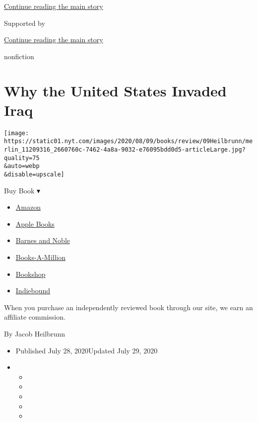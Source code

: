\protect\hyperlink{after-top}{Continue reading the main story}

Supported by

\protect\hyperlink{after-sponsor}{Continue reading the main story}

nonfiction

\hypertarget{why-the-united-states-invaded-iraq}{%
\section{Why the United States Invaded
Iraq}\label{why-the-united-states-invaded-iraq}}

\texttt{[image: https://static01.nyt.com/images/2020/08/09/books/review/09Heilbrunn/merlin\_11209316\_2660760c-7462-4a8a-9032-e76095bdd0d5-articleLarge.jpg?quality=75\\\&auto=webp\\\&disable=upscale]}

Buy Book ▾

\begin{itemize}
\tightlist
\item
  \href{https://www.amazon.com/gp/search?index=books\&tag=NYTBSREV-20\&field-keywords=To+Start+a+War+Robert+Draper}{Amazon}
\item
  \href{https://du-gae-books-dot-nyt-du-prd.appspot.com/buy?title=To+Start+a+War\&author=Robert+Draper}{Apple
  Books}
\item
  \href{https://www.anrdoezrs.net/click-7990613-11819508?url=https\%3A\%2F\%2Fwww.barnesandnoble.com\%2Fw\%2F\%3Fean\%3D9780525561040}{Barnes
  and Noble}
\item
  \href{https://www.anrdoezrs.net/click-7990613-35140?url=https\%3A\%2F\%2Fwww.booksamillion.com\%2Fp\%2FTo\%2BStart\%2Ba\%2BWar\%2FRobert\%2BDraper\%2F9780525561040}{Books-A-Million}
\item
  \href{https://bookshop.org/a/3546/9780525561040}{Bookshop}
\item
  \href{https://www.indiebound.org/book/9780525561040?aff=NYT}{Indiebound}
\end{itemize}

When you purchase an independently reviewed book through our site, we
earn an affiliate commission.

By Jacob Heilbrunn

\begin{itemize}
\item
  Published July 28, 2020Updated July 29, 2020
\item
  \begin{itemize}
  \item
  \item
  \item
  \item
  \item
  \end{itemize}
\end{itemize}

